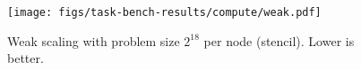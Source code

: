 \begin{figure}[t]
\centering
\texttt{[image: figs/task-bench-results/compute/weak.pdf]}
\vspace{-0.5cm}
\caption{Weak scaling with problem size $2^{18}$ per node (stencil). Lower is better.\label{fig:weak-scaling}}
\vspace{-0.05cm}
\end{figure}
